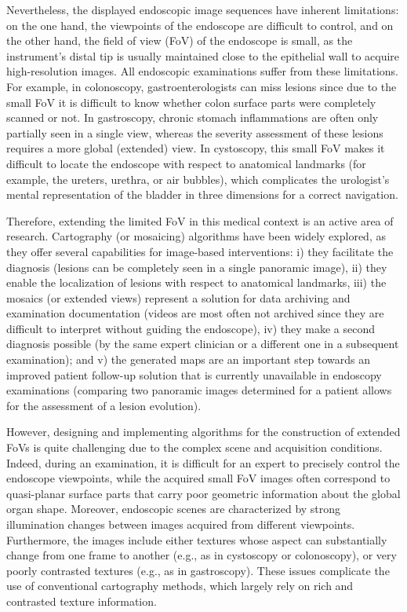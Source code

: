 \documentclass[a4paper,fleqn]{cas-dc}
\begin{document}
Nevertheless, the displayed endoscopic image sequences have inherent limitations: on the one hand, the viewpoints of the endoscope are difficult to control, and on the other hand, the field of view (FoV) of the endoscope is small, as the instrument's distal tip is usually maintained close to the epithelial wall to acquire high-resolution images. All endoscopic examinations suffer from these limitations. For example, in colonoscopy, gastroenterologists can miss lesions since due to the small FoV it is difficult to know whether colon surface parts were completely scanned or not. In gastroscopy,  chronic stomach inflammations are often only partially seen in a single view, whereas the severity assessment of these lesions requires a more global (extended) view. In cystoscopy, this small FoV makes it difficult to locate the endoscope with respect to anatomical landmarks (for example, the ureters, urethra, or air bubbles), which complicates the urologist’s mental representation of the bladder in three dimensions for a correct navigation.  

Therefore, extending the limited FoV  in this medical context is an active area of research. Cartography (or mosaicing) algorithms have been widely explored, as they offer several capabilities for image-based interventions: i) they facilitate the diagnosis (lesions can be completely seen in a single panoramic image), ii) they enable the localization of lesions with respect to anatomical landmarks, iii) the mosaics (or extended views) represent a solution for data archiving and examination documentation (videos are most often not archived since they are difficult to interpret without guiding the endoscope), iv) they make a second diagnosis possible (by the same expert clinician or a different one in a subsequent examination); and v) the generated maps are an important step towards an improved patient follow-up solution that is currently unavailable in endoscopy examinations (comparing two panoramic images determined for a patient allows for the assessment of a lesion evolution). 

However, designing and implementing algorithms for the construction of extended FoVs  is quite challenging due to the complex scene and acquisition conditions. Indeed, during an examination, it is difficult for an expert to precisely control the endoscope viewpoints, while  the acquired small FoV images often correspond to quasi-planar surface parts that carry poor geometric information about the global organ shape. Moreover, endoscopic scenes are characterized by strong illumination changes between images acquired from different viewpoints. Furthermore, the images include either textures whose aspect can substantially change from one frame to another (e.g., as in cystoscopy or colonoscopy), or very poorly contrasted textures (e.g., as in gastroscopy). These issues complicate the use of conventional cartography methods, which largely rely on rich and contrasted texture information.
\end{document}
